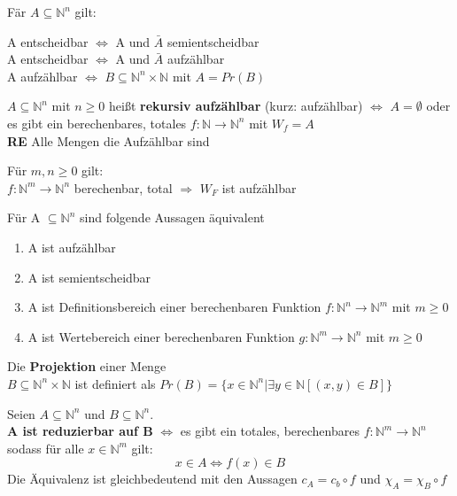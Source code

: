 \documentclass[14pt]{article}
\begin{document}
\begin{eigenschaft}
    Fär $A \subseteq \mathbb{N}^n$ gilt: \\
    \begin{center}
        A entscheidbar $\Leftrightarrow$ A und $\bar{A}$ semientscheidbar \\
        A entscheidbar $\Leftrightarrow$ A und $\bar{A}$ aufzählbar \\
        A aufzählbar $\Leftrightarrow$ $B \subseteq \mathbb{N}^n \times \mathbb{N}$
        mit $A = Pr(B)$
    \end{center}
\end{eigenschaft}
\begin{definition}[Aufzählbarkeit]
    $A \subseteq \mathbb{N}^n$ mit $n \geq 0$ heißt \textbf{rekursiv aufzählbar}
    (kurz: aufzählbar) $\Leftrightarrow$ $A = \emptyset$ oder es gibt ein
    berechenbares, totales $f: \mathbb{N} \rightarrow \mathbb{N}^n$ mit 
    $W_f = A$ \\
    \textbf{RE} Alle Mengen die Aufzählbar sind
\end{definition}
\begin{eigenschaft}
    Für $m, n \geq 0$ gilt: \\
    \indent $f: \mathbb{N}^m \rightarrow \mathbb{N}^n$ berechenbar, total
    $\Rightarrow$ $W_F$ ist aufzählbar
\end{eigenschaft}
\begin{eigenschaft}
    Für A $\subseteq \mathbb{N}^n$ sind folgende Aussagen äquivalent
    \begin{enumerate}
        \item A ist aufzählbar
        \item A ist semientscheidbar
        \item A ist Definitionsbereich einer berechenbaren Funktion
        $f: \mathbb{N}^n \rightarrow \mathbb{N}^m$ mit $m \geq 0$
        \item A ist Wertebereich einer berechenbaren Funktion
        $g: \mathbb{N}^m \rightarrow \mathbb{N}^n$ mit $m \geq 0$
    \end{enumerate}
\end{eigenschaft}
\begin{definition}[Projektion]
    Die \textbf{Projektion} einer Menge \\
    $B \subseteq \mathbb{N}^n \times \mathbb{N}$ ist definiert als $Pr(B) =
    \{ x \in \mathbb{N}^n | \exists y \in \mathbb{N}[(x, y) \in B ]\}$
\end{definition}
\begin{definition}[Reduzierbarkeit]
    Seien $A \subseteq \mathbb{N}^n$ und $B \subseteq \mathbb{N}^n$. \\
    \textbf{A ist reduzierbar auf B} $\Leftrightarrow$ es gibt ein totales,
    berechenbares $f: \mathbb{N}^m \rightarrow \mathbb{N}^n$ sodass für 
    alle $x \in \mathbb{N}^m$ gilt: 
    \[
        x \in A \Leftrightarrow f(x) \in B  
    \]
    Die Äquivalenz ist gleichbedeutend mit den Aussagen $c_A = c_b \circ
    f$ und $\chi_A = \chi_B \circ f$ 
\end{definition}
\end{document}
